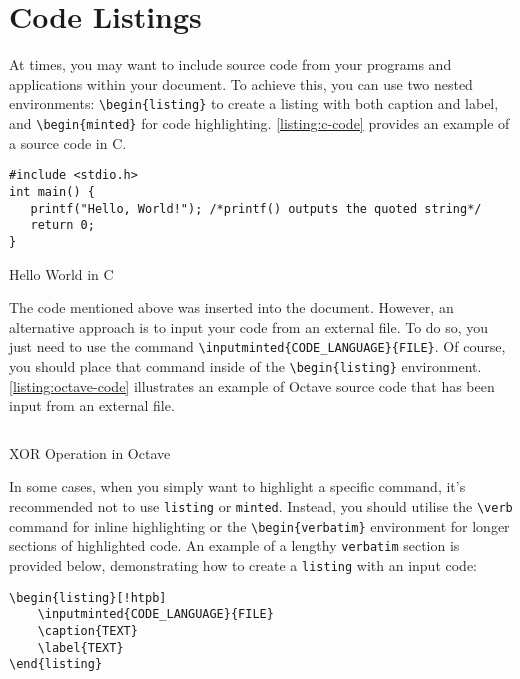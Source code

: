 \chapter{Code Listings}
At times, you may want to include source code from your programs and applications within your document. To achieve this, you can use two nested environments: \verb|\begin{listing}| to create a listing with both caption and label, and \verb|\begin{minted}| for code highlighting. \autoref{listing:c-code} provides an example of a source code in C.

\begin{listing}[!htpb]
\begin{verbatim}
#include <stdio.h>
int main() {
   printf("Hello, World!"); /*printf() outputs the quoted string*/
   return 0;
}
\end{verbatim}
\caption{Hello World in C}
\label{listing:c-code}
\end{listing}

The code mentioned above was inserted into the document. However, an alternative approach is to input your code from an external file. To do so, you just need to use the command \verb|\inputminted{CODE_LANGUAGE}{FILE}|. Of course, you should place that command inside of the \verb|\begin{listing}| environment. \autoref{listing:octave-code} illustrates an example of Octave source code that has been input from an external file.

\begin{listing}[!htpb]
\inputminted{octave}{Code/BitXorMatrix.m}
\caption{XOR Operation in Octave}
\label{listing:octave-code}
\end{listing}

In some cases, when you simply want to highlight a specific command, it's recommended not to use \verb|listing| or \verb|minted|. Instead, you should utilise the \verb|\verb| command for inline highlighting or the \verb|\begin{verbatim}| environment for longer sections of highlighted code. An example of a lengthy \verb|verbatim| section is provided below, demonstrating how to create a \verb|listing| with an input code:

\begin{verbatim}
\begin{listing}[!htpb]
    \inputminted{CODE_LANGUAGE}{FILE}
    \caption{TEXT}
    \label{TEXT}
\end{listing}
\end{verbatim}

